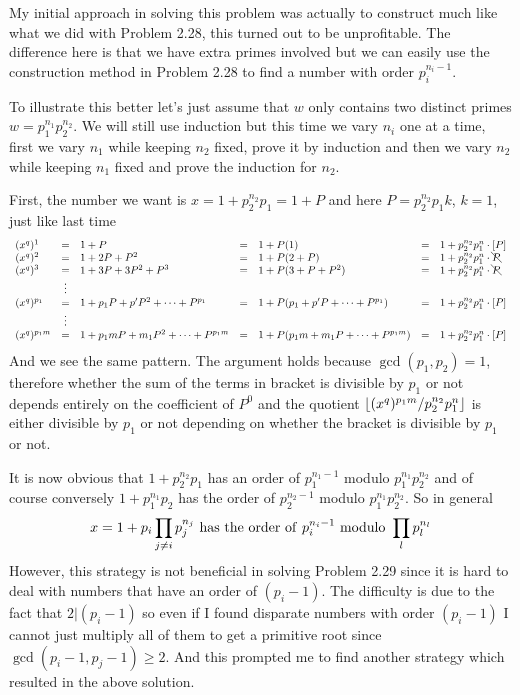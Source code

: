 \documentclass[aps,preprint,preprintnumbers,nofootinbib,showpacs,prd]{revtex4-1}
\newcommand{\nbea}{\begin{eqnarray*}}
\newcommand{\neea}{\end{eqnarray*}}
\DeclarePairedDelimiter{\floor}{\lfloor}{\rfloor}
\begin{document}
My initial approach in solving this problem was actually to construct much like what we did with Problem 2.28, this turned out to be unprofitable. The difference here is that we have extra primes involved but we can easily use the construction method in Problem 2.28 to find a number with order $p_i^{n_i-1}$.

To illustrate this better let's just assume that $w$ only contains two distinct primes $w = p_1^{n_1} p_2^{n_2}$. We will still use induction but this time we vary $n_i$ one at a time, first we vary $n_1$ while keeping $n_2$ fixed, prove it by induction and then we vary $n_2$ while keeping $n_1$ fixed and prove the induction for $n_2$.

First, the number we want is $x=1 + p_2^{n_2} p_1 = 1 + P$ and here $P=p_2^{n_2}p_1 k$, $k=1$, just like last time
%
\nbea
\begin{array} {l c l c l c l}
(x^{q})^1 & = & 1 + P & = & 1 + P(1) & = & 1 + p_2^{n_2}p_1^n \cdot [P] \\
(x^{q})^2 & = & 1 + 2P + P^2 & = & 1 + P(2 + P) & = & 1 + p_2^{n_2}p_1^n \cdot \bcancel{P} \\
(x^{q})^3 & = & 1 + 3P + 3P^2 + P^3 & = & 1 + P(3 + P + P^2) & = & 1 + p_2^{n_2}p_1^n \cdot \bcancel{P} \\
& \vdots & & & & & \\
(x^{q})^{p_1} & = & 1 + p_1P + p'P^2 + \dots + P^{p_1} & = & 1 + P(p_1 + p'P + \dots + P^{p_1}) & = & 1 + p_2^{n_2}p_1^n \cdot [P] \\
& \vdots & & & & & \\
(x^{q})^{p_1m} & = & 1 + p_1mP + m_1P^2 + \dots + P^{p_1 m} & = & 1 + P(p_1m + m_1P + \dots + P^{p_1m}) & = &  1 + p_2^{n_2}p_1^n \cdot [P]
\end{array}
\neea
%
And we see the same pattern. The argument holds because $\gcd(p_1,p_2)=1$, therefore whether the sum of the terms in bracket is divisible by $p_1$ or not depends entirely on the coefficient of $P^0$ and the quotient $\floor{(x^{q})^{p_1m}/p_2^{n_2}p_1^n}$ is either divisible by $p_1$ or not depending on whether the bracket is divisible by $p_1$ or not.

It is now obvious that $1 + p_2^{n_2} p_1$ has an order of $p_1^{n_1-1}$ modulo $p_1^{n_1} p_2^{n_2}$ and of course conversely $1 + p_1^{n_1} p_2$ has the order of $p_2^{n_2-1}$ modulo $p_1^{n_1} p_2^{n_2}$. So in general
%
\nbea
x = 1 + p_i \prod_{j\neq i}p_j^{n_j} {\rm~has~the~order~of~} p_i^{n_i-1} {\rm ~modulo~} \prod_l p_l^{n_l}
\neea
%
However, this strategy is not beneficial in solving Problem 2.29 since it is hard to deal with numbers that have an order of $(p_i - 1)$. The difficulty is due to the fact that $2|(p_i - 1)$ so even if I found disparate numbers with order $(p_i - 1)$ I cannot just multiply all of them to get a primitive root since $\gcd(p_i - 1, p_j - 1) \ge 2$. And this prompted me to find another strategy which resulted in the above solution.
\end{document}
